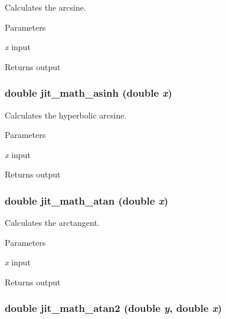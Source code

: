 Calculates the arcsine. 
\begin{DoxyParams}{Parameters}
\item[{\em x}]input \end{DoxyParams}
\begin{DoxyReturn}{Returns}
output 
\end{DoxyReturn}
\hypertarget{group__mathmod_gaa3dcf964eeec7ed87744d7c29e4d3659}{
\subsubsection[{jit\_\-math\_\-asinh}]{\setlength{\rightskip}{0pt plus 5cm}double jit\_\-math\_\-asinh (double {\em x})}}
\label{group__mathmod_gaa3dcf964eeec7ed87744d7c29e4d3659}


Calculates the hyperbolic arcsine. 
\begin{DoxyParams}{Parameters}
\item[{\em x}]input \end{DoxyParams}
\begin{DoxyReturn}{Returns}
output 
\end{DoxyReturn}
\hypertarget{group__mathmod_gab038a3f232d7cbb8587a43b4146ed8f2}{
\subsubsection[{jit\_\-math\_\-atan}]{\setlength{\rightskip}{0pt plus 5cm}double jit\_\-math\_\-atan (double {\em x})}}
\label{group__mathmod_gab038a3f232d7cbb8587a43b4146ed8f2}


Calculates the arctangent. 
\begin{DoxyParams}{Parameters}
\item[{\em x}]input \end{DoxyParams}
\begin{DoxyReturn}{Returns}
output 
\end{DoxyReturn}
\hypertarget{group__mathmod_ga6c2322e36a35450f13c82b201d28f541}{
\subsubsection[{jit\_\-math\_\-atan2}]{\setlength{\rightskip}{0pt plus 5cm}double jit\_\-math\_\-atan2 (double {\em y}, \/  double {\em x})}}
\label{group__mathmod_ga6c2322e36a35450f13c82b201d28f541}


